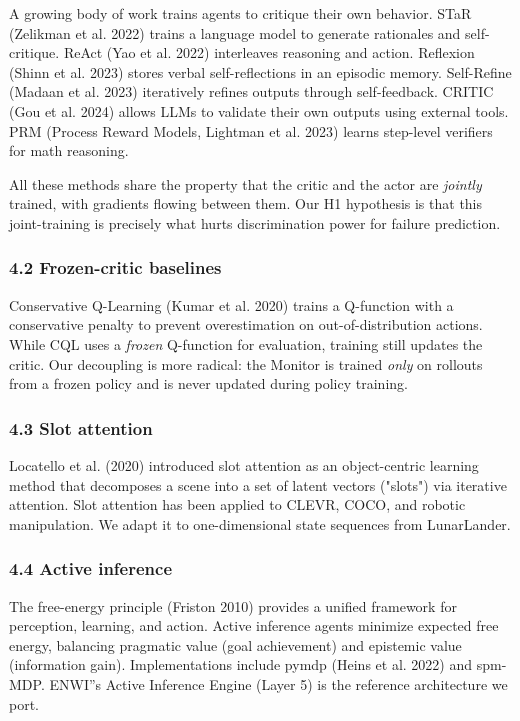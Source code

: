 \documentclass[11pt]{article}
\begin{document}
A growing body of work trains agents to critique their own behavior. STaR
(Zelikman et al. 2022) trains a language model to generate rationales and
self-critique. ReAct (Yao et al. 2022) interleaves reasoning and action. Reflexion
(Shinn et al. 2023) stores verbal self-reflections in an episodic memory.
Self-Refine (Madaan et al. 2023) iteratively refines outputs through self-feedback.
CRITIC (Gou et al. 2024) allows LLMs to validate their own outputs using external
tools. PRM (Process Reward Models, Lightman et al. 2023) learns step-level
verifiers for math reasoning.

All these methods share the property that the critic and the actor are \textit{jointly}
trained, with gradients flowing between them. Our H1 hypothesis is that this
joint-training is precisely what hurts discrimination power for failure prediction.

\subsubsection{4.2 Frozen-critic baselines}

Conservative Q-Learning (Kumar et al. 2020) trains a Q-function with a
conservative penalty to prevent overestimation on out-of-distribution actions.
While CQL uses a \textit{frozen} Q-function for evaluation, training still updates the
critic. Our decoupling is more radical: the Monitor is trained \textit{only} on rollouts
from a frozen policy and is never updated during policy training.

\subsubsection{4.3 Slot attention}

Locatello et al. (2020) introduced slot attention as an object-centric learning
method that decomposes a scene into a set of latent vectors ("slots") via
iterative attention. Slot attention has been applied to CLEVR, COCO, and robotic
manipulation. We adapt it to one-dimensional state sequences from LunarLander.

\subsubsection{4.4 Active inference}

The free-energy principle (Friston 2010) provides a unified framework for
perception, learning, and action. Active inference agents minimize expected free
energy, balancing pragmatic value (goal achievement) and epistemic value
(information gain). Implementations include pymdp (Heins et al. 2022) and
spm-MDP. ENWI''s Active Inference Engine (Layer 5) is the reference architecture
we port.
\end{document}
